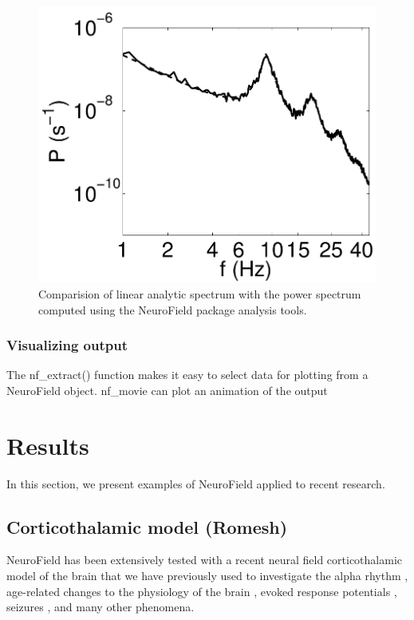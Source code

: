 \documentclass[preprint,review,10pt,authoryear,letterpaper]{elsarticle}
\begin{document}
\begin{figure}[!b]
\begin{center}
\includegraphics[width=0.80\columnwidth]{corticothalamic_comparison}
\caption{Comparision of linear analytic spectrum with the power spectrum computed using the NeuroField package analysis tools.}
\label{fig:ct_spectrum}
\end{center}
\end{figure}

\subsubsection{Visualizing output}
The nf\_extract() function makes it easy to select data for plotting from a NeuroField object.  
nf\_movie can plot an animation of the output

\clearpage

\section{Results}

In this section, we present examples of NeuroField applied to recent research.

\subsection{Corticothalamic model (Romesh)}

NeuroField has been extensively tested with a recent neural field corticothalamic model of the brain \citep{Robinson2005,Rowe2004413,PhysRevE.63.021903,PhysRevE.65.041924,Robinson:04aa} that we have previously used to investigate the alpha rhythm \citep{PhysRevE.68.021922,PhysRevE.70.011911}, age-related changes to the physiology of the brain \citep{VanAlbada2010}, evoked response potentials \citep{Rennie2002,ker11}, seizures \citep{Breakspear2006}, and many other phenomena. 
\end{document}
